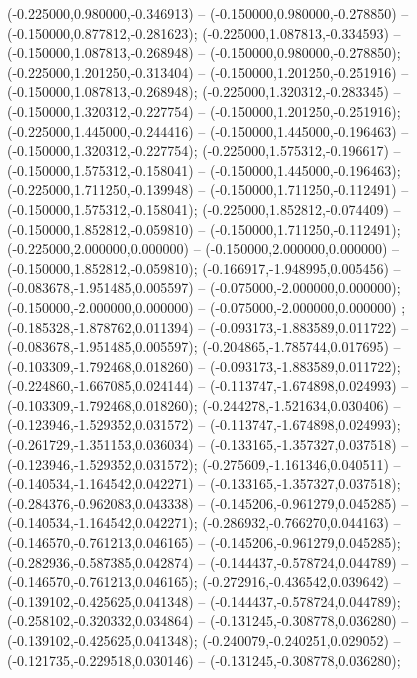  (-0.225000,0.980000,-0.346913) -- (-0.150000,0.980000,-0.278850) -- (-0.150000,0.877812,-0.281623);
 (-0.225000,1.087813,-0.334593) -- (-0.150000,1.087813,-0.268948) -- (-0.150000,0.980000,-0.278850);
 (-0.225000,1.201250,-0.313404) -- (-0.150000,1.201250,-0.251916) -- (-0.150000,1.087813,-0.268948);
 (-0.225000,1.320312,-0.283345) -- (-0.150000,1.320312,-0.227754) -- (-0.150000,1.201250,-0.251916);
 (-0.225000,1.445000,-0.244416) -- (-0.150000,1.445000,-0.196463) -- (-0.150000,1.320312,-0.227754);
 (-0.225000,1.575312,-0.196617) -- (-0.150000,1.575312,-0.158041) -- (-0.150000,1.445000,-0.196463);
 (-0.225000,1.711250,-0.139948) -- (-0.150000,1.711250,-0.112491) -- (-0.150000,1.575312,-0.158041);
 (-0.225000,1.852812,-0.074409) -- (-0.150000,1.852812,-0.059810) -- (-0.150000,1.711250,-0.112491);
 (-0.225000,2.000000,0.000000) -- (-0.150000,2.000000,0.000000) -- (-0.150000,1.852812,-0.059810);
 (-0.166917,-1.948995,0.005456) -- (-0.083678,-1.951485,0.005597) -- (-0.075000,-2.000000,0.000000);
 (-0.150000,-2.000000,0.000000) -- (-0.075000,-2.000000,0.000000) ;
 (-0.185328,-1.878762,0.011394) -- (-0.093173,-1.883589,0.011722) -- (-0.083678,-1.951485,0.005597);
 (-0.204865,-1.785744,0.017695) -- (-0.103309,-1.792468,0.018260) -- (-0.093173,-1.883589,0.011722);
 (-0.224860,-1.667085,0.024144) -- (-0.113747,-1.674898,0.024993) -- (-0.103309,-1.792468,0.018260);
 (-0.244278,-1.521634,0.030406) -- (-0.123946,-1.529352,0.031572) -- (-0.113747,-1.674898,0.024993);
 (-0.261729,-1.351153,0.036034) -- (-0.133165,-1.357327,0.037518) -- (-0.123946,-1.529352,0.031572);
 (-0.275609,-1.161346,0.040511) -- (-0.140534,-1.164542,0.042271) -- (-0.133165,-1.357327,0.037518);
 (-0.284376,-0.962083,0.043338) -- (-0.145206,-0.961279,0.045285) -- (-0.140534,-1.164542,0.042271);
 (-0.286932,-0.766270,0.044163) -- (-0.146570,-0.761213,0.046165) -- (-0.145206,-0.961279,0.045285);
 (-0.282936,-0.587385,0.042874) -- (-0.144437,-0.578724,0.044789) -- (-0.146570,-0.761213,0.046165);
 (-0.272916,-0.436542,0.039642) -- (-0.139102,-0.425625,0.041348) -- (-0.144437,-0.578724,0.044789);
 (-0.258102,-0.320332,0.034864) -- (-0.131245,-0.308778,0.036280) -- (-0.139102,-0.425625,0.041348);
 (-0.240079,-0.240251,0.029052) -- (-0.121735,-0.229518,0.030146) -- (-0.131245,-0.308778,0.036280);
